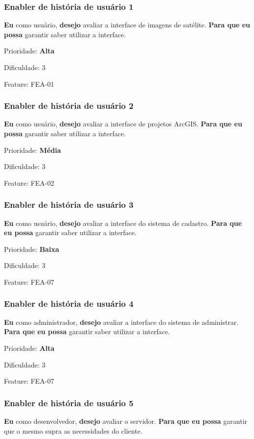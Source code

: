   \subsubsection{Enabler de história de usuário 1}
    \textbf{Eu} como usuário, \textbf{desejo} avaliar a interface de imagens de satélite. \textbf{Para que eu possa} garantir saber utilizar a interface.

    Prioridade: \textbf{Alta}

    Dificuldade: 3

    Feature: FEA-01

  \subsubsection{Enabler de história de usuário 2}
    \textbf{Eu} como usuário, \textbf{desejo} avaliar a interface de projetos ArcGIS. \textbf{Para que eu possa} garantir saber utilizar a interface.

    Prioridade: \textbf{Média}

    Dificuldade: 3

    Feature: FEA-02

  \subsubsection{Enabler de história de usuário 3}
    \textbf{Eu} como usuário, \textbf{desejo} avaliar a interface do sistema de cadastro. \textbf{Para que eu possa} garantir saber utilizar a interface.

    Prioridade: \textbf{Baixa}

    Dificuldade: 3

    Feature: FEA-07

  \subsubsection{Enabler de história de usuário 4}
    \textbf{Eu} como administrador, \textbf{desejo} avaliar a interface do sistema de administrar. \textbf{Para que eu possa} garantir saber utilizar a interface.

    Prioridade: \textbf{Alta}

    Dificuldade: 3

    Feature: FEA-07

  \subsubsection{Enabler de história de usuário 5}
    \textbf{Eu} como desenvolvedor, \textbf{desejo} avaliar o servidor. \textbf{Para que eu possa} garantir que o mesmo supra as necessidades do cliente.

